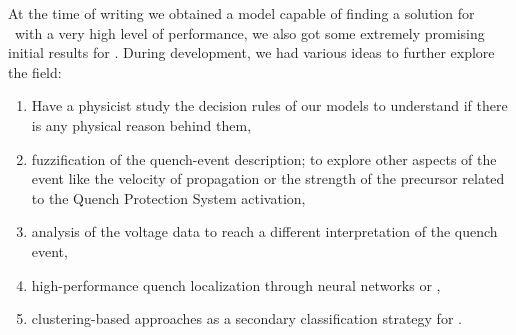 \documentclass[a4paper, notitlepage]{article}
\begin{document}
At the time of writing we obtained a model capable of finding a solution for \qrp\ with a very
high level of performance, we also got some extremely promising initial results for \qlp. During
development, we had various ideas to further explore the field:
\begin{enumerate}
	\item Have a physicist study the decision rules of our models to understand if there is
	      any physical reason behind them,
	\item fuzzification of the quench-event description; to explore other aspects of the event
	      like the velocity of propagation or the strength of the precursor related to the
	      Quench Protection System activation,
	\item analysis of the voltage data to reach a different interpretation of the quench event,
	\item high-performance quench localization through neural networks or \svcs,
	\item clustering-based approaches as a secondary classification strategy for \qlp.
\end{enumerate}

\printbibliography
\end{document}
